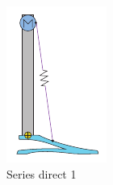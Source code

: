 \begin{figure}[hb!]
\begin{subfigure}{.19\textwidth}
      \includegraphics[width=\linewidth]{figures/illustration_serial_direct_i.pdf}
      \caption{Series direct 1}
      \label{fig:series_direct_i}
    \end{subfigure}
    \begin{subfigure}{.19\textwidth}
      \centering

\end{subfigure}
\end{figure}

